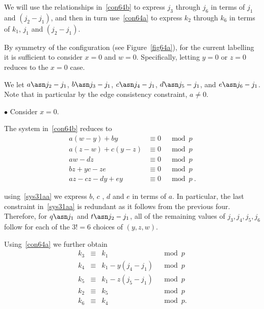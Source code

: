 We will use the relationships in~\eqref{con64b} to express $j_3$
through $j_6$ in terms of $j_1$ and $(j_2-j_1)$, and then in turn
use~\eqref{con64a} to express $k_2 $ through $k_6$ in terms of
$k_1$, $j_1$ and $(j_2-j_1)$.


 By symmetry of the
configuration (see Figure~\ref{fig64a}), for the current labelling
it is sufficient to consider $x=0$ and $w=0$. Specifically,
letting $y=0$ or $z=0$ reduces to the $x=0$ case.

We let $a \asn j_2-j_1$, $b \asn j_3-j_1$, $c \asn j_4-j_1$,
 $d \asn j_5-j_1$, and $e \asn j_6-j_1$.  Note that in particular
 by the edge consistency constraint, $a \neq 0$.

$\bullet$ Consider $x=0$.


The system in~\eqref{con64b} reduces to
 \begin{equation}\label{sys31aa}\begin{array}{ccccc}
 a(w-y)+by &\equiv 0 &\mod p\\
 a(z-w)+c(y-z)  &\equiv 0 &\mod p\\
 aw-dz &\equiv 0 &\mod p\\
 bz+yc-ze &\equiv 0 &\mod p\\
 az-cz-dy+ey &\equiv 0 &\mod p~.
 \end{array}
 \end{equation}

using~\eqref{sys31aa} we express $b$, $c$ , $d$ and $e$ in terms
of $a$. In particular, the last constraint in~\eqref{sys31aa} is
redundant as it follows from the previous four. Therefore, for $q
\asn j_1$ and $t \asn j_2-j_1$, all of the remaining values of
$j_3,j_4,j_5,j_6$ follow for each of the $3!=6$ choices of
$(y,z,w)$.

Using~\eqref{con64a} we further obtain
\begin{equation}\begin{array}{ccccc}
k_3 & \equiv& k_1 &\mod p\\
k_4 & \equiv& k_1-y(j_4-j_1) &\mod p\\
k_5 &\equiv& k_1-z(j_5-j_1) &\mod p\\
k_2 &\equiv& k_5 &\mod p\\
k_6 &\equiv& k_4 &\mod p. \end{array}\end{equation}

